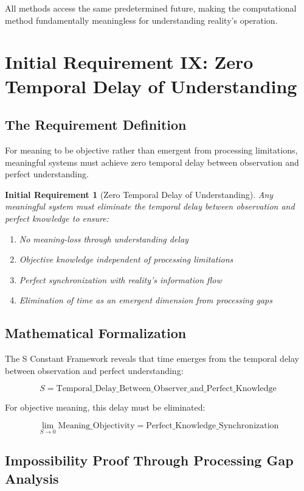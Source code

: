 \documentclass[12pt,a4paper]{article}
\newtheorem{requirement}[theorem]{Initial Requirement}
\begin{document}
All methods access the same predetermined future, making the computational method fundamentally meaningless for understanding reality's operation.

\section{Initial Requirement IX: Zero Temporal Delay of Understanding}

\subsection{The Requirement Definition}

For meaning to be objective rather than emergent from processing limitations, meaningful systems must achieve zero temporal delay between observation and perfect understanding.

\begin{requirement}[Zero Temporal Delay of Understanding]
Any meaningful system must eliminate the temporal delay between observation and perfect knowledge to ensure:
\begin{enumerate}
\item No meaning-loss through understanding delay
\item Objective knowledge independent of processing limitations
\item Perfect synchronization with reality's information flow
\item Elimination of time as an emergent dimension from processing gaps
\end{enumerate}
\end{requirement}

\subsection{Mathematical Formalization}

The S Constant Framework reveals that time emerges from the temporal delay between observation and perfect understanding:

$$S = \text{Temporal\_Delay\_Between\_Observer\_and\_Perfect\_Knowledge}$$

For objective meaning, this delay must be eliminated:

$$\lim_{S \to 0} \text{Meaning\_Objectivity} = \text{Perfect\_Knowledge\_Synchronization}$$

\subsection{Impossibility Proof Through Processing Gap Analysis}
\end{document}
